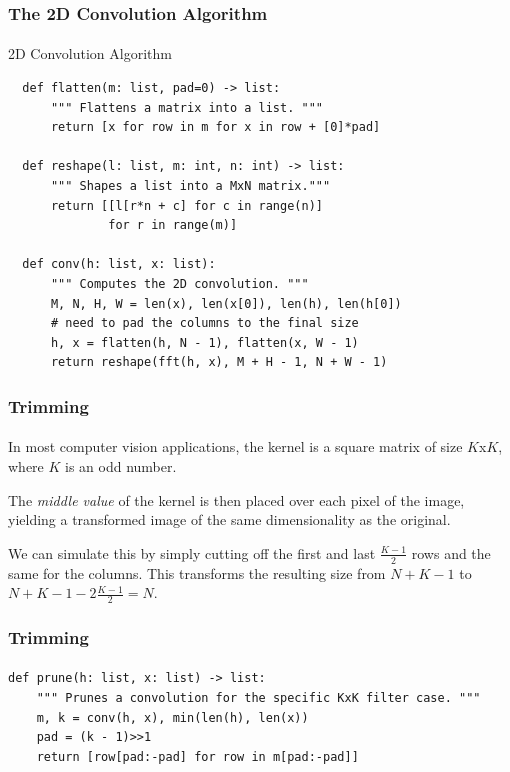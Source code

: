\documentclass{beamer}                             %
\begin{document}
\begin{frame}[fragile]
\frametitle{The 2D Convolution Algorithm}
\framesubtitle{}
\begin{algorithm}[H]
  \caption{2D Convolution Algorithm}
  \begin{verbatim}
  def flatten(m: list, pad=0) -> list:
      """ Flattens a matrix into a list. """
      return [x for row in m for x in row + [0]*pad]

  def reshape(l: list, m: int, n: int) -> list:
      """ Shapes a list into a MxN matrix."""
      return [[l[r*n + c] for c in range(n)]
              for r in range(m)]

  def conv(h: list, x: list):
      """ Computes the 2D convolution. """
      M, N, H, W = len(x), len(x[0]), len(h), len(h[0])
      # need to pad the columns to the final size
      h, x = flatten(h, N - 1), flatten(x, W - 1)
      return reshape(fft(h, x), M + H - 1, N + W - 1)
  \end{verbatim}
\end{algorithm}
\end{frame}

\begin{frame}
\frametitle{Trimming}
\framesubtitle{}
In most computer vision applications, the kernel is a square matrix
of size \( K \)x\( K \), where \( K \) is an odd number. \pause

The \textit{middle value} of the kernel is then placed over each pixel of the
image, yielding a transformed image of the same dimensionality as the original.
\pause

We can simulate this by simply cutting off the first and last
\( \frac{K - 1}{2} \) rows and the same for the columns.
This transforms the resulting size from \( N + K - 1 \) to
\( N + K - 1 - 2 \frac{K - 1}{2} = N \).
\end{frame}

\begin{frame}[fragile]
\frametitle{Trimming}
\framesubtitle{}
\begin{verbatim}
def prune(h: list, x: list) -> list:
    """ Prunes a convolution for the specific KxK filter case. """
    m, k = conv(h, x), min(len(h), len(x))
    pad = (k - 1)>>1
    return [row[pad:-pad] for row in m[pad:-pad]]
\end{verbatim}
\end{frame}
\end{document}
